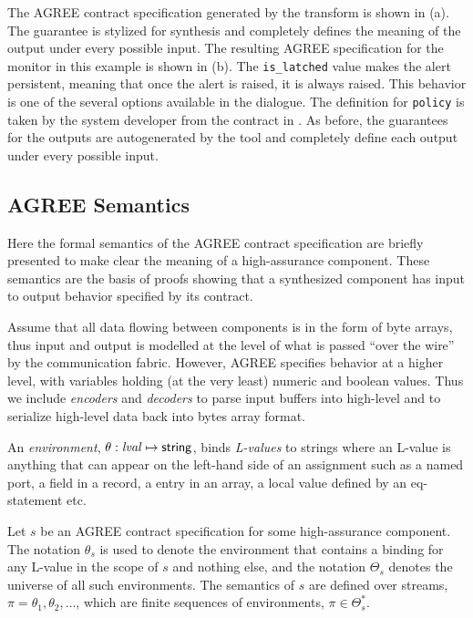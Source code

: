 The AGREE contract specification generated by the transform is shown in (a). The guarantee is stylized for synthesis and completely defines the meaning of the output under every possible input.
The resulting AGREE specification for the monitor in this example is shown in (b). The \texttt{is\_latched} value makes the alert persistent, meaning that once the alert is raised, it is always raised.  This behavior is one of the several options available in the dialogue. The definition for \texttt{policy} is taken by the system developer from the contract in . As before, the guarantees for the outputs are autogenerated by the tool and completely define each output under every possible input.

\subsection{AGREE Semantics}
\label{agree-semantics}

Here the formal semantics of the AGREE contract specification are
briefly presented to make clear the meaning of a high-assurance
component.  These semantics are the basis of proofs showing that a
synthesized component has input to output behavior specified by its
contract.

Assume that all data flowing between components is in the form of byte
arrays, thus input and output is modelled at the level of what is
passed ``over the wire'' by the communication fabric. However, AGREE
specifies behavior at a higher level, with variables holding (at the
very least) numeric and boolean values. Thus we
include \emph{encoders} and \emph{decoders} to parse input buffers
into high-level and to serialize high-level data back into bytes array
format.

An \emph{environment}, $\theta: \mathit{lval} \mapsto \mathsf{string}$,
binds \emph{L-values} to strings where an L-value is anything that can
appear on the left-hand side of an assignment such as a named port, a
field in a record, a entry in an array, a local value defined by an
eq-statement etc.

Let $s$ be an AGREE contract specification for some high-assurance
component. The notation $\theta_s$ is used to denote the environment that
contains a binding for any L-value in the scope of $s$ and nothing else, and
the notation $\Theta_s$ denotes the universe of all such environments. The
semantics of $s$ are defined over streams, $\pi = \theta_1, \theta_2, \ldots$, which
are finite sequences of environments, $\pi \in \Theta_s^*$.

